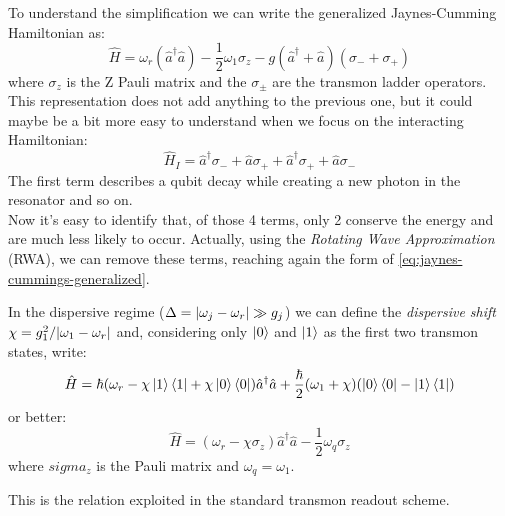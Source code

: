 To understand the simplification we can write the generalized Jaynes-Cumming Hamiltonian as:
\begin{equation}
    \hat H = \omega_r(\hat a ^ \dagger \hat a) - \frac{1}{2}\omega_1\sigma_z - g(\hat a ^ \dagger + \hat a)(\sigma_-+\sigma_+)
\end{equation}
where $\sigma_z$  is the Z Pauli matrix and the $\sigma_\pm$ are the transmon ladder operators.\\
This representation does not add anything to the previous one, but it could maybe be a bit more easy to understand when we focus on the interacting Hamiltonian:
\begin{equation}
    \hat H_{I} = \hat a ^ \dagger \sigma_- + \hat a \sigma_+ + \hat a ^ \dagger \sigma_+ + \hat a \sigma_-
\end{equation}
The first term describes a qubit decay while creating a new photon in the resonator and so on.\\
Now it's easy to identify that, of those 4 terms, only 2 conserve the energy and are much less likely to occur.
Actually, using the \textit{Rotating Wave Approximation} (RWA), we can remove these terms, reaching again the form of \cref{eq:jaynes-cummings-generalized}.

In the dispersive regime ($\Delta = \abs{\omega_j - \omega_r}\gg g_j$) we can define the \textit{dispersive shift} $\chi = g_1^2/\abs{\omega_1-\omega_r}$ and, considering only $\ket 0$ and $\ket 1$ as the first two transmon states, write:
\begin{equation}
    \hat H = \hbar (\omega_r - \chi \ket 1 \bra 1 + \chi \ket 0 \bra 0 ) \hat a ^ \dagger \hat a + \frac{\hbar}{2}(\omega_1 + \chi) (\ket 0 \bra 0 - \ket 1 \bra 1)
\end{equation}
or better:
\begin{equation}\label{eq:readout_equation}
    \hat H = (\omega_r - \chi \sigma_z) \hat a ^\dagger \hat a - \frac{1}{2}\omega_q\sigma_z
\end{equation}
where $sigma_z$ is the Pauli matrix and $\omega_q =\omega_1$.

This is the relation exploited in the standard transmon readout scheme.

